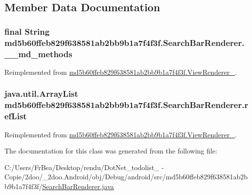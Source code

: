 \subsection{Member Data Documentation}
\hypertarget{classmd5b60ffeb829f638581ab2bb9b1a7f4f3f_1_1_search_bar_renderer_5f0e642da7b2413e781c8137331a275e}{
\subsubsection[{\_\-\_\-md\_\-methods}]{\setlength{\rightskip}{0pt plus 5cm}final String {\bf md5b60ffeb829f638581ab2bb9b1a7f4f3f.SearchBarRenderer.\_\-\_\-md\_\-methods}}}
\label{classmd5b60ffeb829f638581ab2bb9b1a7f4f3f_1_1_search_bar_renderer_5f0e642da7b2413e781c8137331a275e}




Reimplemented from \hyperlink{classmd5b60ffeb829f638581ab2bb9b1a7f4f3f_1_1_view_renderer__2_80b609e3e4054c380887d4dc2907a875}{md5b60ffeb829f638581ab2bb9b1a7f4f3f.ViewRenderer\_}.\hypertarget{classmd5b60ffeb829f638581ab2bb9b1a7f4f3f_1_1_search_bar_renderer_0f1acb862b764a09166bdf7a4a2c1e4a}{
\subsubsection[{refList}]{\setlength{\rightskip}{0pt plus 5cm}java.util.ArrayList {\bf md5b60ffeb829f638581ab2bb9b1a7f4f3f.SearchBarRenderer.refList}}}
\label{classmd5b60ffeb829f638581ab2bb9b1a7f4f3f_1_1_search_bar_renderer_0f1acb862b764a09166bdf7a4a2c1e4a}




Reimplemented from \hyperlink{classmd5b60ffeb829f638581ab2bb9b1a7f4f3f_1_1_view_renderer__2_6c151401977148a92c515e9c7de1aaf8}{md5b60ffeb829f638581ab2bb9b1a7f4f3f.ViewRenderer\_}.

The documentation for this class was generated from the following file:\begin{CompactItemize}
\item 
C:/Users/FrBea/Desktop/rendu/DotNet\_\-todolist\_ - Copie/2doo/\_\-2doo.Android/obj/Debug/android/src/md5b60ffeb829f638581ab2bb9b1a7f4f3f/\hyperlink{_search_bar_renderer_8java}{SearchBarRenderer.java}\end{CompactItemize}
